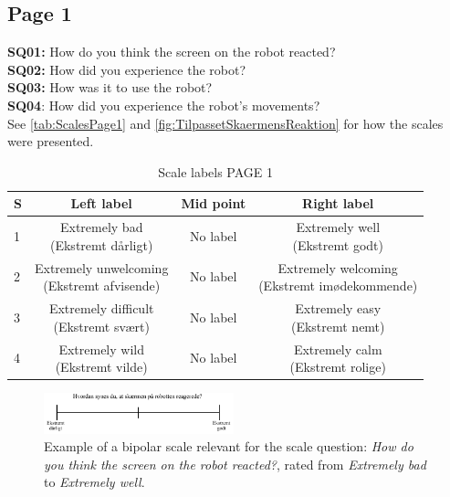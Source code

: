 \subsection{Page 1}
\noindent
\textbf{SQ01:} How do you think the screen on the robot reacted? \\%
\textbf{SQ02:} How did you experience the robot? \\ %
\textbf{SQ03:} How was it to use the robot?\\%
\textbf{SQ04}: How did you experience the robot's movements? \\%
See \autoref{tab:ScalesPage1} and \autoref{fig:TilpassetSkaermensReaktion} for how the scales were presented.
\begin{table}[H]
	\centering
\caption{Scale labels PAGE 1}
	\label{tab:ScalesPage1} 
	\begin{tabular}{l|c|c|c}
		S     & Left label & Mid point & Right label \\\hline
		1   & \makecell{Extremely bad\\(Ekstremt dårligt)}  & No label & \makecell{Extremely well \\(Ekstremt godt)}        \\\hline
		2   & \makecell{Extremely unwelcoming \\(Ekstremt afvisende)} & No label & \makecell{Extremely welcoming \\(Ekstremt imødekommende)}         \\\hline
		3   & \makecell{Extremely difficult \\(Ekstremt svært)} & No label & \makecell{Extremely easy \\(Ekstremt nemt)}         \\\hline
	 	4   & \makecell{Extremely wild \\(Ekstremt vilde)} & No label & \makecell{Extremely calm \\(Ekstremt rolige)}               
	\end{tabular}        
\end{table}
\noindent
%
\begin{figure}[H]
\centering
\includegraphics[width = 0.49\textwidth]{Figure/TilpassetSkaermensReaktion}
\setlength{} 
\caption{Example of a bipolar scale relevant for the scale question: \textit{How do you think the screen on the robot reacted?}, rated from \textit{Extremely bad} to \textit{Extremely well}.}
\label{fig:TilpassetSkaermensReaktion}
\end{figure}
\noindent
% 
